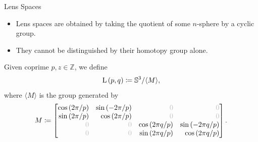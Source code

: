 \begin{frame}{Lens Spaces}
	\begin{itemize}
		\item Lens spaces are obtained by taking the quotient of some $n$-sphere by a cyclic group.
		\item They cannot be distinguished by their homotopy group alone.
	\end{itemize}
	\pause
	\begin{definition}
		Given coprime $p, z \in \mathbb Z$, we define
		\begin{align*}
			\operatorname{L}\left(p,q\right) \coloneq \mathbb{S}^3/\langle M \rangle,
		\end{align*}
		where $\langle M \rangle$ is the group generated by
		\begin{align*}
			M \coloneq
			\begin{bmatrix*}[r]
				\cos{(2 \pi / p)} & \sin{(-2 \pi / p)} & \ghostzero          & \ghostzero           \\
				\sin{(2 \pi / p)} & \cos{(2 \pi / p)}  & \ghostzero          & \ghostzero           \\
				\ghostzero        & \ghostzero         & \cos{(2 \pi q / p)} & \sin{(-2 \pi q / p)} \\
				\ghostzero        & \ghostzero         & \sin{(2 \pi q / p)} & \cos{(2 \pi q / p)}
			\end{bmatrix*}.
		\end{align*}
	\end{definition}

\end{frame}
